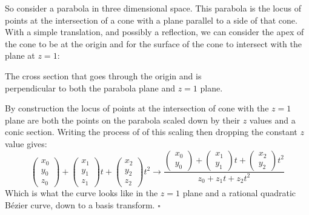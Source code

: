 So consider a parabola in three dimensional space.
This parabola is the locus of points at the intersection of a cone with a plane parallel to a side of that cone.
With a simple translation,
and possibly a reflection,
we can consider the apex of the cone to be at the origin and for the surface of the cone to intersect with the plane at $z=1$:
\begin{center}

The cross section that goes through the origin and is\\
perpendicular to both the parabola plane and $z=1$ plane.
\end{center}
By construction the locus of points at the intersection of cone with the $z=1$ plane are both the points on the parabola scaled down by their $z$ values and a conic section.
Writing the process of of this scaling then dropping the constant $z$ value gives:
\[\begin{pmatrix}x_0\\y_0\\z_0\end{pmatrix}+\begin{pmatrix}x_1\\y_1\\z_1\end{pmatrix}t +\begin{pmatrix}x_2\\y_2\\z_2\end{pmatrix}t^2\rightarrow
	\frac{\begin{pmatrix}x_0\\y_0\end{pmatrix}+\begin{pmatrix}x_1\\y_1\end{pmatrix}t +\begin{pmatrix}x_2\\y_2\end{pmatrix}t^2}{z_0+z_1t+z_2t^2}\]
Which is what the curve looks like in the $z=1$ plane and a rational quadratic Bézier curve,
down to a basis transform. $\square$
\\

